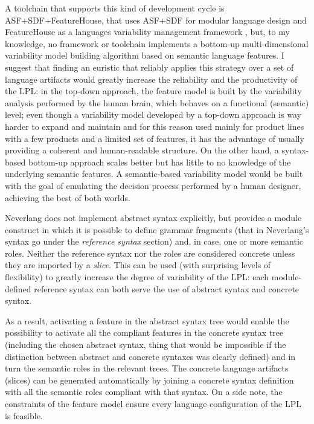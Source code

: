A toolchain that supports this kind of development cycle is ASF+SDF+FeatureHouse, that uses ASF+SDF for modular language design and FeatureHouse as a languages variability management framework \cite{Liebig13}, but, to my knowledge, no framework or toolchain implements a bottom-up multi-dimensional variability model building algorithm based on semantic language features. I suggest that finding an euristic that reliably applies this strategy over a set of language artifacts would greatly increase the reliability and the productivity of the LPL: in the top-down approach, the feature model is built by the variability analysis performed by the human brain, which behaves on a functional (semantic) level; even though a variability model developed by a top-down approach is way harder to expand and maintain and for this reason used mainly for product lines with a few products and a limited set of features, it has the advantage of usually providing a coherent and human-readable structure. On the other hand, a syntax-based bottom-up approach scales better but has little to no knowledge of the underlying semantic features. A semantic-based variability model would be built with the goal of emulating the decision process performed by a human designer, achieving the best of both worlds.

Neverlang does not implement abstract syntax explicitly, but provides a module construct in which it is possible to define grammar fragments (that in Neverlang's syntax go under the \textit{reference syntax} section) and, in case, one or more semantic roles. Neither the reference syntax nor the roles are considered concrete unless they are imported by a \textit{slice}. This can be used (with surprising levels of flexibility) to greatly increase the degree of variability of the LPL: each module-defined reference syntax can both serve the use of abstract syntax and concrete syntax.

As a result, activating a feature in the abstract syntax tree would enable the possibility to activate all the compliant features in the concrete syntax tree (including the chosen abstract syntax, thing that would be impossible if the distinction between abstract and concrete syntaxes was clearly defined) and in turn the semantic roles in the relevant trees. The concrete language artifacts (slices) can be generated automatically by joining a concrete syntax definition with all the semantic roles compliant with that syntax. On a side note, the constraints of the feature model ensure every language configuration of the LPL is feasible.

